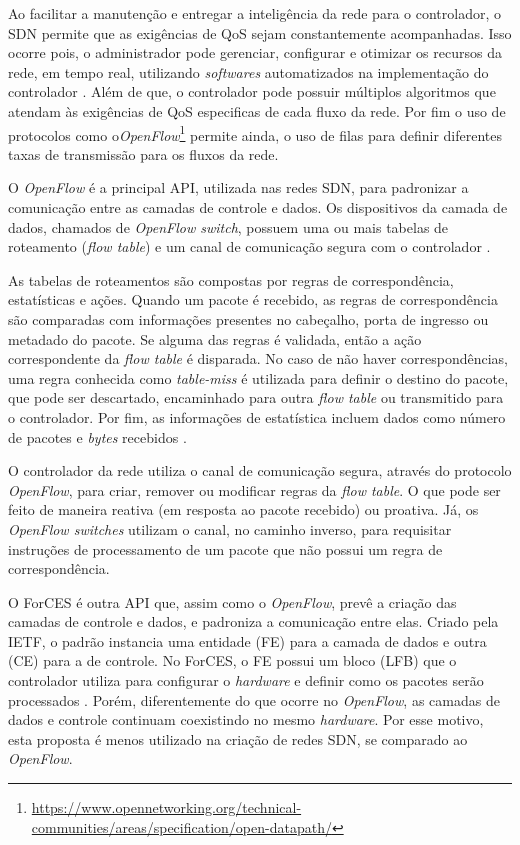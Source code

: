 Ao facilitar a manutenção e entregar a inteligência da rede para o controlador, o \ac{SDN} permite que as exigências de \ac{QoS} sejam constantemente acompanhadas. Isso ocorre pois, o administrador pode gerenciar, configurar e otimizar os recursos da rede, em tempo real, utilizando \textit{softwares} automatizados na implementação do controlador \cite{karakus2017quality}. Além de que, o controlador pode possuir múltiplos algoritmos que atendam às exigências de \ac{QoS} especificas de cada fluxo da rede. Por fim o uso de protocolos como o\textit{OpenFlow}\footnote{\url{https://www.opennetworking.org/technical-communities/areas/specification/open-datapath/}} permite ainda,  o uso de filas para definir diferentes taxas de transmissão para os fluxos da rede.

O \textit{OpenFlow} é a principal \ac{API}, utilizada nas redes SDN, para padronizar a comunicação entre as camadas de controle e dados. Os dispositivos da camada de dados, chamados de \textit{OpenFlow switch}, possuem uma ou mais tabelas de roteamento (\textit{flow table}) e um canal de comunicação segura com o controlador \cite{Klauberg2016}.

 As tabelas de roteamentos são compostas por regras de correspondência, estatísticas e ações. Quando um pacote é recebido, as regras de correspondência são comparadas com informações presentes no cabeçalho, porta de ingresso ou metadado do pacote. Se alguma das regras é validada, então a ação correspondente da \textit{flow table} é disparada. No caso de não haver correspondências, uma regra conhecida como \textit{table-miss} é utilizada para definir o destino do pacote, que pode ser descartado, encaminhado para outra \textit{flow table} ou transmitido para o controlador. Por fim, as informações de estatística incluem dados como número de pacotes e \textit{bytes} recebidos \cite{nunes2014survey}.
 
 O controlador da rede utiliza o canal de comunicação segura, através do protocolo \textit{OpenFlow}, para criar, remover ou modificar regras da \textit{flow table}. O que pode ser feito de maneira reativa (em resposta ao pacote recebido) ou proativa. Já, os \textit{OpenFlow switches} utilizam o canal, no caminho inverso, para requisitar instruções de processamento de um pacote que não possui um regra de correspondência.
 
O \ac{ForCES} é outra \ac{API} que, assim como o \textit{OpenFlow}, prevê a criação das camadas de controle e dados, e padroniza a comunicação entre elas. Criado pela \ac{IETF}, o padrão instancia uma entidade (\ac{FE}) para a camada de dados e outra (\ac{CE}) para a de controle. No \ac{ForCES}, o \ac{FE} possui um bloco (\ac{LFB}) que o controlador utiliza para configurar o \textit{hardware} e definir como os pacotes serão processados \cite{nunes2014survey}. Porém, diferentemente do que ocorre no \textit{OpenFlow}, as camadas de dados e controle continuam coexistindo no mesmo \textit{hardware}. Por esse motivo, esta proposta é menos utilizado na criação de redes SDN, se comparado ao \textit{OpenFlow}. 
 
